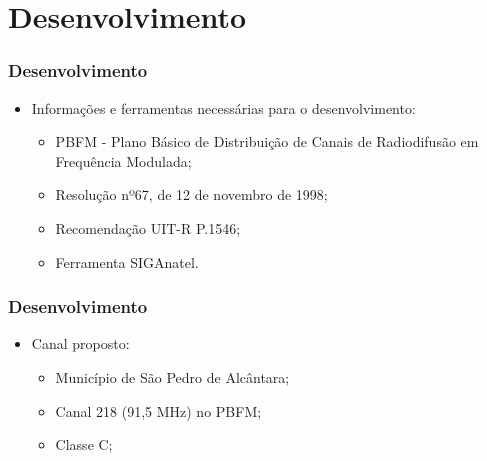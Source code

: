 \documentclass{beamer}
\begin{document}
    \section{Desenvolvimento}
      
    \begin{frame}
    
      \frametitle{Desenvolvimento}
      \begin{itemize}
          \item Informações e ferramentas necessárias para o desenvolvimento:
	\begin{itemize}
 
	  \item PBFM - Plano Básico de Distribuição de Canais de Radiodifusão em Frequência Modulada;
	  \item Resolução nº67, de 12 de novembro de 1998;
	  \item Recomendação UIT-R P.1546;
	  \item Ferramenta SIGAnatel.
      
      \end{itemize}
  \end{itemize} 
    \end{frame}
    
    \begin{frame}
    
      \frametitle{Desenvolvimento}
      
      \begin{itemize}
      
         \item  Canal proposto:
          
       
          
	\begin{itemize}
	
	  \item Município de São Pedro de Alcântara;
	  \item Canal 218 (91,5 MHz) no PBFM;
	  \item Classe C;
      
      \end{itemize}
   \end{itemize}
    \end{frame}
    
\end{document}
